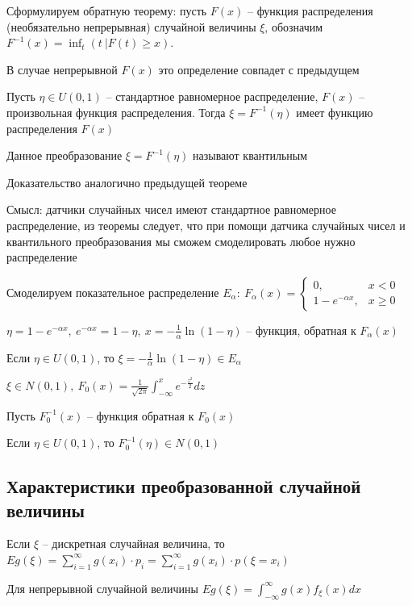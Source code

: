\documentclass[12pt]{article}
\begin{document}
    Сформулируем обратную теорему: пусть $F(x)$ -- функция распределения (необязательно непрерывная) случайной величины $\xi$,
    обозначим $F^{-1}(x) = \inf_t (t \ | F(t) \geq x)$.

    В случае непрерывной $F(x)$ это определение совпадет с предыдущем

    \begin{MyTheorem}
         Пусть $\eta \in U(0, 1)$ -- стандартное равномерное распределение, $F(x)$ -- произвольная функция распределения. 
        Тогда $\xi = F^{-1}(\eta)$ имеет функцию распределения $F(x)$
    \end{MyTheorem}

    Данное преобразование $\xi = F^{-1}(\eta)$ называют квантильным

    Доказательство аналогично предыдущей теореме
    
    Смысл: датчики случайных чисел имеют стандартное равномерное распределение, из теоремы следует, что при помощи
    датчика случайных чисел и квантильного преобразования мы сможем смоделировать любое нужно распределение

     Смоделируем показательное распределение $E_\alpha: \ F_\alpha(x) = \begin{cases}0, & x < 0 \\ 1 - e^{-\alpha x}, & x \geq 0\end{cases}$

    $\eta = 1 - e^{-\alpha x}, \ e^{-\alpha x} = 1 - \eta, \ x = -\frac{1}{\alpha} \ln(1 - \eta)$ -- функция, обратная к $F_\alpha(x)$

    Если $\eta \in U(0, 1)$, то $\xi = -\frac{1}{\alpha} \ln(1 - \eta) \in E_\alpha$

     $\xi \in N(0, 1), \ F_0(x) = \frac{1}{\sqrt{2\pi}} \int_{-\infty}^x e^{-\frac{z^2}{2}} dz$

    Пусть $F_0^{-1}(x)$ -- функция обратная к $F_0(x)$

    Если $\eta \in U(0, 1)$, то $F_0^{-1}(\eta) \in N(0, 1)$

    \subsection{Характеристики преобразованной случайной величины}

    \hypertarget{expectedvalueoftransformedvariable}{}

    \begin{MyTheorem}
        \Ths Если $\xi$ -- дискретная случайная величина, то $Eg(\xi) = \sum_{i = 1}^\infty g(x_i) \cdot p_i = \sum_{i = 1}^\infty g(x_i) \cdot p(\xi = x_i)$

        Для непрерывной случайной величины $Eg(\xi) = \int_{-\infty}^{\infty} g(x) f_\xi(x) dx$
    \end{MyTheorem}
\end{document}
